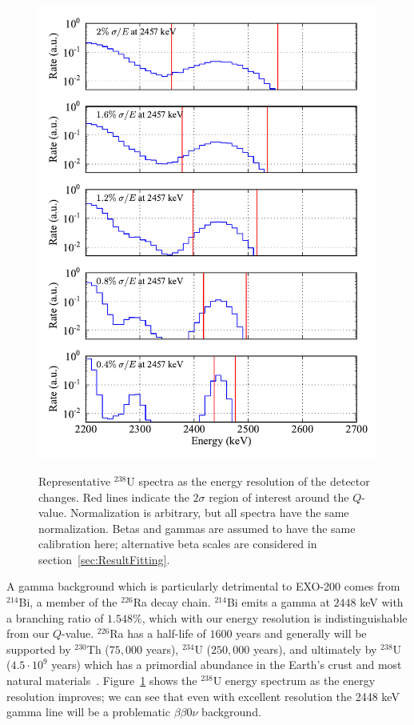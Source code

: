 \begin{figure}
\begin{center}
\includegraphics[keepaspectratio=true,width=.92\textwidth]{scripts/U_Spectra_vs_Res.pdf}
\end{center}
\renewcommand{\baselinestretch}{1}
\small\normalsize
\begin{quote}
\caption{Representative $^{238}$U spectra as the energy resolution of the detector changes.  Red lines indicate the $2\sigma$ region of interest around the $Q$-value.  Normalization is arbitrary, but all spectra have the same normalization.  Betas and gammas are assumed to have the same calibration here; alternative beta scales are considered in section~\ref{sec:ResultFitting}.}
\label{fig:USpectraVsResolution}
\end{quote}
\end{figure}
\renewcommand{\baselinestretch}{2}
\small\normalsize

A gamma background which is particularly detrimental to EXO-200 comes from $^{214}$Bi, a member of the $^{226}$Ra decay chain.  $^{214}$Bi emits a gamma at $2448$ keV with a branching ratio of $1.548\%$, which with our energy resolution is indistinguishable from our $Q$-value.   $^{226}$Ra has a half-life of $1600$ years and generally will be supported by $^{230}$Th ($75,000$ years), $^{234}$U ($250,000$ years), and ultimately by $^{238}$U ($4.5 \cdot 10^9$ years) which has a primordial abundance in the Earth's crust and most natural materials~\cite{ENSDF}.  Figure~\ref{fig:USpectraVsResolution} shows the $^{238}$U energy spectrum as the energy resolution improves; we can see that even with excellent resolution the 2448 keV gamma line will be a problematic $\beta\beta 0\nu$ background.

